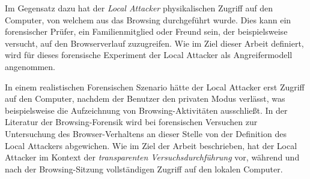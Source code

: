 Im Gegensatz dazu hat der \textit{Local Attacker} physikalischen Zugriff auf den Computer, von welchem aus das Browsing durchgeführt wurde. Dies kann ein forensischer Prüfer, ein Familienmitglied oder Freund sein, der  beispielsweise versucht, auf den Browserverlauf zuzugreifen. 
Wie im Ziel dieser Arbeit definiert, wird für dieses forensische Experiment der Local Attacker als Angreifermodell angenommen. \cite{Aggarwal.2010}

In einem realistischen Forensischen Szenario hätte der Local Attacker erst Zugriff auf den Computer, nachdem der Benutzer den privaten Modus verlässt, was beispielsweise die Aufzeichnung von Browsing-Aktivitäten ausschließt. \cite{Aggarwal.2010}
In der Literatur der Browsing-Forensik wird bei forensischen Versuchen zur Untersuchung des Browser-Verhaltens an dieser Stelle von der Definition des Local Attackers abgewichen. 
Wie im Ziel der Arbeit beschrieben, hat der Local Attacker im Kontext der \textit{transparenten Versuchsdurchführung} vor, während und nach der Browsing-Sitzung vollständigen Zugriff auf den lokalen Computer. \cite{Fayyad.2021, Rochmadi.2017}




